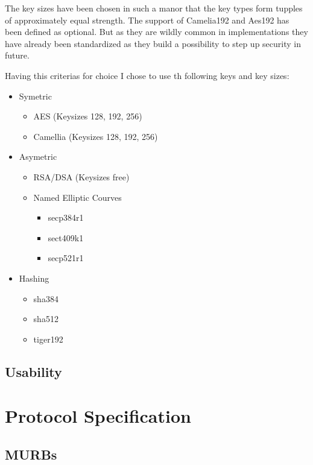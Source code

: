 The key sizes have been chosen in such a manor that the key types form tupples of approximately equal strength. The support of Camelia192 and Aes192 has been defined as optional. But as they are wildly common in implementations they have already been standardized as they  build a possibility to step up security in future.

Having this criterias for choice I chose to use th following keys and key sizes:
\begin{itemize}
	\item Symetric
	\begin{itemize}
		\item AES (Keysizes 128, 192, 256)
		\item Camellia (Keysizes 128, 192, 256)
	\end{itemize}
	\item Asymetric
	\begin{itemize}
		\item RSA/DSA (Keysizes free)
		\item Named Elliptic Courves
		\begin{itemize}
			\item secp384r1
			\item sect409k1
			\item secp521r1
		\end{itemize}
	\end{itemize}
	\item Hashing
	\begin{itemize}
		\item sha384
		\item sha512
		\item tiger192
	\end{itemize}
\end{itemize}

\subsection{Usability}

\section{Protocol Specification}

\subsection{MURBs}

